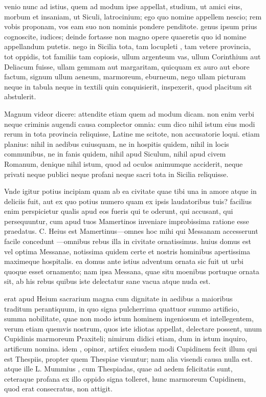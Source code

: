 
 venio nunc ad istius, quem ad modum ipse appellat, studium, ut amici eius, morbum et insaniam, ut Siculi, latrocinium; ego quo nomine appellem nescio; rem vobis proponam, vos eam suo non nominis pondere penditote. genus ipsum prius cognoscite, iudices; deinde fortasse non magno opere quaeretis quo id nomine appellandum putetis. nego in Sicilia tota, tam locupleti , tam vetere provincia, tot oppidis, tot familiis tam copiosis, ullum argenteum vas, ullum Corinthium aut Deliacum fuisse, ullam gemmam aut margaritam, quicquam ex auro aut ebore factum, signum ullum aeneum, marmoreum, eburneum, nego ullam picturam neque in tabula neque in textili quin conquisierit, inspexerit, quod placitum sit abstulerit.

 Magnum videor dicere: attendite etiam quem ad modum dicam. non enim verbi neque criminis augendi causa complector omnia: cum dico nihil istum eius modi rerum in tota provincia reliquisse, Latine me scitote, non accusatorie loqui. etiam planius: nihil in aedibus cuiusquam, ne in hospitis quidem, nihil in locis communibus, ne in fanis quidem, nihil apud Siculum, nihil apud civem Romanum, denique nihil istum, quod ad oculos animumque acciderit, neque privati neque publici neque profani neque sacri tota in Sicilia reliquisse.

 Vnde igitur potius incipiam quam ab ea civitate quae tibi una in amore atque in deliciis fuit, aut ex quo potius numero quam ex ipsis laudatoribus tuis? facilius enim perspicietur qualis apud eos fueris qui te oderunt, qui accusant, qui persequuntur, cum apud tuos Mamertinos inveniare improbissima ratione esse praedatus. C. Heius est Mamertinus—omnes hoc mihi qui Messanam accesserunt facile concedunt —omnibus rebus illa in civitate ornatissimus. huius domus est vel optima Messanae, notissima quidem certe et nostris hominibus apertissima maximeque hospitalis. ea domus ante istius adventum ornata sic fuit ut urbi quoque esset ornamento; nam ipsa Messana, quae situ moenibus portuque ornata sit, ab his rebus quibus iste delectatur sane vacua atque nuda est.

 erat apud Heium sacrarium magna cum dignitate in aedibus a maioribus traditum perantiquum, in quo signa pulcherrima quattuor summo artificio, summa nobilitate, quae non modo istum hominem ingeniosum et intellegentem, verum etiam quemvis nostrum, quos iste idiotas appellat, delectare possent, unum Cupidinis marmoreum Praxiteli; nimirum didici etiam, dum in istum inquiro, artificum nomina. idem , opinor, artifex eiusdem modi Cupidinem fecit illum qui est Thespiis, propter quem Thespiae visuntur; nam alia visendi causa nulla est. atque ille L. Mummius , cum Thespiadas, quae ad aedem felicitatis sunt, ceteraque profana ex illo oppido signa tolleret, hunc marmoreum Cupidinem, quod erat consecratus, non attigit.

